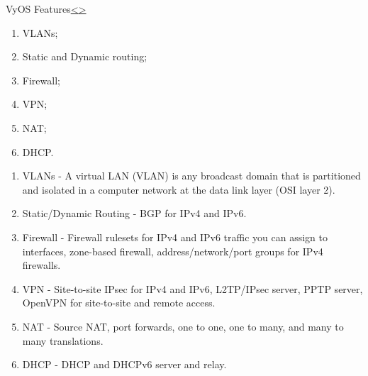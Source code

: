 \documentclass[12pt]{article}
\newenvironment{instructionblock}{\Large\bgroup}{\egroup}
\begin{document}
\pagebreak
\begin{slide}{VyOS Features}{\hyperref[slide 4]{\textless}\hyperref[slide 6]{\textgreater}}
	\begin{instructionblock}
    \begin{enumerate}
    \item VLANs;
    \item Static and Dynamic routing;
    \item Firewall;
    \item VPN;
    \item NAT;
    \item DHCP. 
    \end{enumerate}		
	\end{instructionblock}
\end{slide}
\begin{enumerate}
	\item VLANs - A virtual LAN (VLAN) is any broadcast domain that is partitioned and isolated in a computer network at the data link layer (OSI layer 2).
    \item Static/Dynamic Routing - BGP for IPv4 and IPv6.
    \item Firewall - Firewall rulesets for IPv4 and IPv6 traffic you can assign to interfaces, zone-based firewall, address/network/port groups for IPv4 firewalls.
    \item VPN - Site-to-site IPsec for IPv4 and IPv6, L2TP/IPsec server, PPTP server, OpenVPN for site-to-site and remote access.
    \item NAT - Source NAT, port forwards, one to one, one to many, and many to many translations.
    \item DHCP - DHCP and DHCPv6 server and relay.
\end{enumerate}
\end{document}
